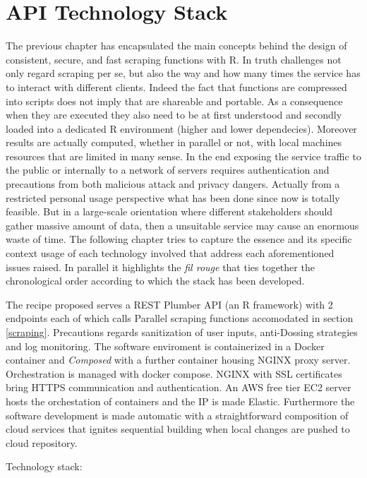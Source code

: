\documentclass[
  12pt,
  a4paper,
  oneside]{book}
\theoremstyle{definition}
\theoremstyle{definition}
\theoremstyle{definition}
\theoremstyle{remark}
\begin{document}
\hypertarget{Infrastructure}{%
\chapter{API Technology Stack}\label{Infrastructure}}

The previous chapter has encapsulated the main concepts behind the design of consistent, secure, and fast scraping functions with R. In truth challenges not only regard scraping per se, but also the way and how many times the service has to interact with different clients. Indeed the fact that functions are compressed into scripts does not imply that are shareable and portable. As a consequence when they are executed they also need to be at first understood and secondly loaded into a dedicated R environment (higher and lower dependecies). Moreover results are actually computed, whether in parallel or not, with local machines resources that are limited in many sense. In the end exposing the service traffic to the public or internally to a network of servers requires authentication and precautions from both malicious attack and privacy dangers. Actually from a restricted personal usage perspective what has been done since now is totally feasible. But in a large-scale orientation where different stakeholders should gather massive amount of data, then a unsuitable service may cause an enormous waste of time.
The following chapter tries to capture the essence and its specific context usage of each technology involved that address each aforementioned issues raised. In parallel it highlights the \emph{fil rouge} that ties together the chronological order according to which the stack has been developed.

The recipe proposed serves a REST Plumber API (an R framework) with 2 endpoints each of which calls Parallel scraping functions accomodated in section \ref{scraping}. Precautions regards sanitization of user inputs, anti-Dossing strategies and log monitoring. The software enviroment is containerized in a Docker container and \emph{Composed} with a further container housing NGINX proxy server. Orchestration is managed with docker compose. NGINX with SSL certificates bring HTTPS communication and authentication. An AWS free tier EC2 server hosts the orchestation of containers and the IP is made Elastic. Furthermore the software development is made automatic with a straightforward composition of cloud services that ignites sequential building when local changes are pushed to cloud repository.

Technology stack:
\end{document}
